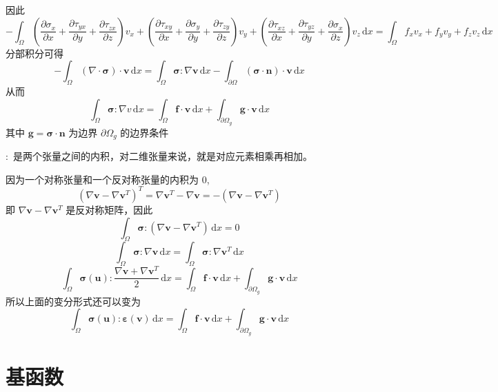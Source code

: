 \documentclass[12pt,a4paper]{article}
\begin{document}
因此
$$
-\int_{\Omega}^{} (\frac{\partial\sigma_x}{\partial x}+\frac{\partial\tau_{yx}}{\partial y}+\frac{\partial\tau_{zx}}{\partial z})v_x + (\frac{\partial\tau_{xy}}{\partial x}+\frac{\partial\sigma_{y}}{\partial y}+\frac{\partial\tau_{zy}}{\partial z})v_y +(\frac{\partial\tau_{xz}}{\partial x}+\frac{\partial\tau_{yz}}{\partial y}+\frac{\partial\sigma_{x}}{\partial z})v_z \, \mathrm{d}x=
\int_{\Omega}^{} f_x v_x + f_y v_y +f_z v_z \, \mathrm{d}x
$$
分部积分可得
$$
-\int_{\Omega}^{}(\nabla\cdot\boldsymbol{\sigma})\cdot\boldsymbol{v}\, \mathrm{d}x=
\int_{\Omega}^{}\boldsymbol{\sigma}:\nabla\boldsymbol{v} \, \mathrm{d}x-\int_{\partial\Omega}^{} (\boldsymbol{\sigma}\cdot\boldsymbol{n})\cdot\boldsymbol{v} \, \mathrm{d}x
$$
从而
$$
\int_{\Omega}^{}\boldsymbol{\sigma}:\nabla v \, \mathrm{d}x=\int_{\Omega}^{}\boldsymbol{f}\cdot\boldsymbol{v}\, \mathrm{d}x+\int_{\partial\Omega _g}^{}\boldsymbol{g}\cdot\boldsymbol{v}\, \mathrm{d}x
$$
其中 $\boldsymbol{g}=\boldsymbol{\sigma}\cdot\boldsymbol{n}$ 为边界 $\partial\Omega _g$ 的边界条件

$:$ 是两个张量之间的内积，对二维张量来说，就是对应元素相乘再相加。

因为一个对称张量和一个反对称张量的内积为 $0$,
$$
(\nabla\boldsymbol{v}-\nabla\boldsymbol{v}^T)^T=\nabla\boldsymbol{v}^T-\nabla\boldsymbol{v}=-(\nabla\boldsymbol{v}-\nabla\boldsymbol{v}^T)
$$
即 $\nabla\boldsymbol{v}-\nabla\boldsymbol{v}^T$ 是反对称矩阵，因此
$$
\int_{\Omega}^{} \boldsymbol{\sigma}:(\nabla\boldsymbol{v}-\nabla\boldsymbol{v}^T) \, \mathrm{d}x = 0
$$
$$
\int_{\Omega}^{} \boldsymbol{\sigma}:\nabla\boldsymbol{v} \, \mathrm{d}x =\int_{\Omega}^{} \boldsymbol{\sigma}:\nabla\boldsymbol{v}^T \, \mathrm{d}x
$$
$$
\int_{\Omega}^{}\boldsymbol{\sigma}(\boldsymbol{u}):\frac{\nabla\boldsymbol{v}+\nabla\boldsymbol{v}^T}{2} \, \mathrm{d}x=\int_{\Omega}^{}\boldsymbol{f}\cdot\boldsymbol{v}\, \mathrm{d}x+\int_{\partial\Omega _g}^{}\boldsymbol{g}\cdot\boldsymbol{v}\, \mathrm{d}x
$$
所以上面的变分形式还可以变为
$$
\int_{\Omega}^{}\boldsymbol{\sigma}(\boldsymbol{u}):\boldsymbol{\varepsilon}(\boldsymbol{v}) \, \mathrm{d}x=\int_{\Omega}^{}\boldsymbol{f}\cdot\boldsymbol{v}\, \mathrm{d}x+\int_{\partial\Omega _g}^{}\boldsymbol{g}\cdot\boldsymbol{v}\, \mathrm{d}x
$$

\section{基函数}
\end{document}
